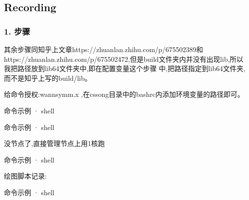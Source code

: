 \documentclass[lang=cn,scheme=chinese,color=blue,device=normal,toc=onecol,math=cm]{elegantbook}
\begin{document}
\subsection{Recording}


\subsubsection{1. 步骤}


其余步骤同知乎上文章https:/\allowbreak{}/\allowbreak{}zhuanlan.zhihu.com/\allowbreak{}p/\allowbreak{}675502389和https:/\allowbreak{}/\allowbreak{}zhuanlan.zhihu.com/\allowbreak{}p/\allowbreak{}675502472,但是build文件夹内并没有出现lib,所以我把路径放到lib64文件夹中,即在配置变量这个步骤 中,把路径指定到lib64文件夹,而不是知乎上写的build/\allowbreak{}lib。\par


给命令授权:wannsymm.x ,在cssong目录中的bashrc内添加环境变量的路径即可。\par


\begin{inlinecodebox}{命令示例 · shell}
\end{inlinecodebox}


\begin{inlinecodebox}{命令示例 · shell}
\end{inlinecodebox}


没节点了,直接管理节点上用1核跑\par


\begin{inlinecodebox}{命令示例 · shell}
\end{inlinecodebox}


绘图脚本记录:\par


\begin{inlinecodebox}{命令示例 · shell}
\end{inlinecodebox}
\end{document}
